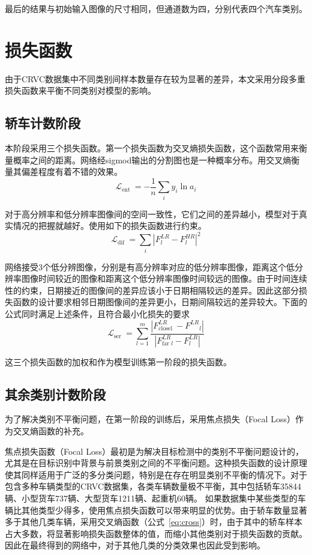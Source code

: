 最后的结果与初始输入图像的尺寸相同，但通道数为四，分别代表四个汽车类别。
\section{损失函数}
由于CRVC数据集中不同类别间样本数量存在较为显著的差异，本文采用分段多重损失函数来平衡不同类别对模型的影响。
\subsection{轿车计数阶段}
本阶段采用三个损失函数。第一个损失函数为交叉熵损失函数，这个函数常用来衡量概率之间的距离。网络经sigmod输出的分割图也是一种概率分布。用交叉熵衡量其偏差程度有着不错的效果。
\begin{equation}
    \mathcal{L}_{\text {ent }}=-\frac{1}{n} \sum_{i} y_{i} \ln a_{i}
    \label{eq:cross}
\end{equation}

对于高分辨率和低分辨率图像间的空间一致性，它们之间的差异越小，模型对于真实情况的把握就越好。使用如下的损失函数进行约束。
\begin{equation}
    \mathcal{L}_{\text {dif }}=\sum_{i}\left|F_l^{L R}-F^{HR}_{l}\right|^2
\end{equation}

网络接受3个低分辨图像，分别是有高分辨率对应的低分辨率图像，距离这个低分辨率图像时间较近的图像和距离这个低分辨率图像时间较远的图像。由于时间连续性的约束，日期接近的图像间的差异应该小于日期相隔较远的差异。因此这部分损失函数的设计要求相邻日期图像间的差异更小，日期间隔较远的差异较大。下面的公式同时满足上述条件，且符合最小化损失的要求
\begin{equation}
    \mathcal{L}_{\text {ser }}=\sum_{l=1}^{m} \frac{\left|F_{\text {closel }}^{L R}-F^{L R}{ }_{l}\right|}{\left|F_{\text {far } l}^{L R}-F^{L R}_ l\right|}
\end{equation}

这三个损失函数的加权和作为模型训练第一阶段的损失函数。


\subsection{其余类别计数阶段}
为了解决类别不平衡问题，在第一阶段的训练后，采用焦点损失（Focal Loss）作为交叉熵函数的补充。

焦点损失函数（Focal Loss）\cite{2018FocalLossDenseObjectDetection}最初是为解决目标检测中的类别不平衡问题设计的，尤其是在目标识别中背景与前景类别之间的不平衡问题。这种损失函数的设计原理使其同样适用于广泛的多分类问题，特别是在存在明显类别不平衡的情况下。对于包含多种车辆类型的CRVC数据集，各类车辆数量极不平衡，其中包括轿车35844辆、小型货车737辆、大型货车1211辆、起重机60辆。 如果数据集中某些类型的车辆比其他类型少得多，使用焦点损失函数可以带来明显的优势。由于轿车数量显著多于其他几类车辆，采用交叉熵函数（公式~\ref{eq:cross}）时，由于其中的轿车样本占大多数，将显著影响损失函数整体的值，而缩小其他类别对于损失函数的贡献。因此在最终得到的网络中，对于其他几类的分类效果也因此受到影响。


